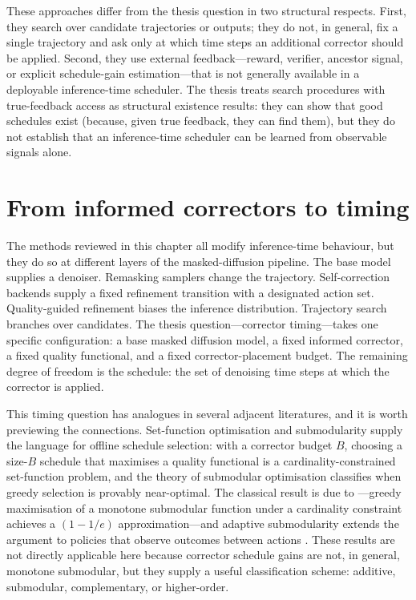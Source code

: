 These approaches differ from the thesis question in two structural
respects. First, they search over candidate trajectories or outputs; they
do not, in general, fix a single trajectory and ask only at which time
steps an additional corrector should be applied. Second, they use external
feedback---reward, verifier, ancestor signal, or explicit schedule-gain
estimation---that is not generally available in a deployable inference-time
scheduler. The thesis treats search procedures with true-feedback access
as structural existence results: they can show that good schedules exist
(because, given true feedback, they can find them), but they do not
establish that an inference-time scheduler can be learned from observable
signals alone.

\section{From informed correctors to timing}
\label{lit:sec:to-timing}

The methods reviewed in this chapter all modify inference-time behaviour,
but they do so at different layers of the masked-diffusion pipeline. The
base model supplies a denoiser. Remasking samplers change the trajectory.
Self-correction backends supply a fixed refinement transition with a
designated action set. Quality-guided refinement biases the inference
distribution. Trajectory search branches over candidates. The thesis
question---corrector timing---takes one specific configuration: a base
masked diffusion model, a fixed informed corrector, a fixed quality
functional, and a fixed corrector-placement budget. The remaining degree
of freedom is the schedule: the set of denoising time steps at which the
corrector is applied.

This timing question has analogues in several adjacent literatures, and it
is worth previewing the connections. Set-function optimisation and
submodularity supply the language for offline schedule selection: with a
corrector budget $B$, choosing a size-$B$ schedule that maximises a
quality functional is a cardinality-constrained set-function problem, and
the theory of submodular optimisation classifies when greedy selection is
provably near-optimal. The classical result is due to
\textcite{nemhauser1978submodular}---greedy maximisation of a monotone
submodular function under a cardinality constraint achieves a $(1-1/e)$
approximation---and adaptive submodularity extends the argument to
policies that observe outcomes between actions
\parencite{golovin2011adaptive}. These results are not directly applicable
here because corrector schedule gains are not, in general, monotone
submodular, but they supply a useful classification scheme: additive,
submodular, complementary, or higher-order.

